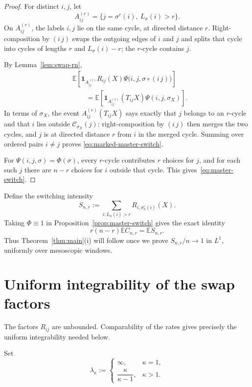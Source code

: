 \documentclass[11pt]{article}
\newcommand{\E}{\mathbb E}
\newcommand{\1}{\mathbf 1}
\theoremstyle{definition}
\theoremstyle{remark}
\begin{document}
\begin{proof}
For distinct $i,j$, let
\[
  A_{ij}^{(r)}=\{j=\sigma^r(i),\ L_\sigma(i)>r\}.
\]
On $A_{ij}^{(r)}$, the labels $i,j$ lie on the same cycle, at directed
distance $r$.  Right-composition by $(i\,j)$ swaps the outgoing edges of
$i$ and $j$ and splits that cycle into cycles of lengths $r$ and
$L_\sigma(i)-r$; the $r$-cycle contains $j$.

By Lemma~\ref{lem:swap-rn},
\begin{align*}
 &\E\left[
   \1_{A_{ij}^{(r)}}R_{ij}(X)
   \Psi\bigl(i,j,\sigma\circ(i\,j)\bigr)
 \right] \\
 &\qquad=
 \E\left[
   \1_{A_{ij}^{(r)}}(T_{ij}X)\Psi(i,j,\sigma_X)
 \right].
\end{align*}
In terms of $\sigma_X$, the event $A_{ij}^{(r)}(T_{ij}X)$ says exactly
that $j$ belongs to an $r$-cycle and that $i$ lies outside
$\mathcal C_{\sigma_X}(j)$: right-composition by $(i\,j)$ then merges the
two cycles, and $j$ is at directed distance $r$ from $i$ in the merged
cycle.  Summing over ordered pairs $i\ne j$ proves
\eqref{eq:marked-master-switch}.

For $\Psi(i,j,\sigma)=\Phi(\sigma)$, every $r$-cycle contributes $r$
choices for $j$, and for each such $j$ there are $n-r$ choices for $i$
outside that cycle.  This gives~\eqref{eq:master-switch}.
\end{proof}

Define the switching intensity
\begin{equation}\label{eq:S-def}
  S_{n,r}
  :=\sum_{i:L_n(i)>r}R_{i,\sigma_n^r(i)}(X).
\end{equation}
Taking $\Phi\equiv1$ in Proposition~\ref{prop:master-switch} gives the
exact identity
\begin{equation}\label{eq:first-switch-exact}
  r(n-r)\E C_{n,r}=\E S_{n,r}.
\end{equation}
Thus Theorem~\ref{thm:main}(i) will follow once we prove
$S_{n,r}/n\to1$ in $L^1$, uniformly over mesoscopic windows.

\section{Uniform integrability of the swap factors}

The factors $R_{ij}$ are unbounded.  Comparability of the rates gives
precisely the uniform integrability needed below.

Set
\begin{equation}\label{eq:lambda-kappa}
 \lambda_\kappa:=
 \begin{cases}
   \infty,&\kappa=1,\\[1mm]
   \dfrac{\kappa}{\kappa-1},&\kappa>1.
 \end{cases}
\end{equation}
\end{document}
